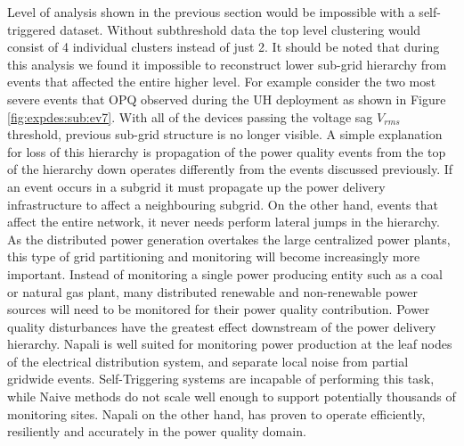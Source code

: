 Level of analysis shown in the previous section would be impossible with a self-triggered dataset.
Without subthreshold data the top level clustering would consist of 4 individual clusters instead of just 2.
It should be noted that during this analysis we found it impossible to reconstruct lower sub-grid  hierarchy from events that affected the entire higher level.
For example consider the two most severe events that OPQ observed during the UH deployment as shown in Figure \ref{fig:expdes:sub:ev7}.
With all of the devices passing the voltage sag $V_{rms}$ threshold, previous sub-grid structure is no longer visible.
A simple explanation for loss of this hierarchy is  propagation of the power quality events from the top of the hierarchy down operates differently from the events discussed previously.
If an event occurs in a subgrid it must propagate up the power delivery infrastructure to affect a neighbouring subgrid.
On the other hand, events that affect the entire network, it never needs perform lateral jumps in the hierarchy.
As the distributed power generation overtakes the large centralized power plants, this type of grid partitioning and monitoring will become increasingly more important.
Instead of monitoring a single power producing entity such as a coal or natural gas plant, many distributed renewable and non-renewable power sources will need to be monitored for their power quality contribution.
Power quality disturbances have the greatest effect downstream of the power delivery hierarchy.
Napali is well suited for monitoring power production at the leaf nodes of the electrical distribution system, and separate local noise from partial gridwide events.
Self-Triggering systems are incapable of performing this task, while Naive methods do not scale well enough to support potentially thousands of monitoring sites.
Napali on the other hand, has proven to operate efficiently, resiliently and accurately in the power quality domain.
